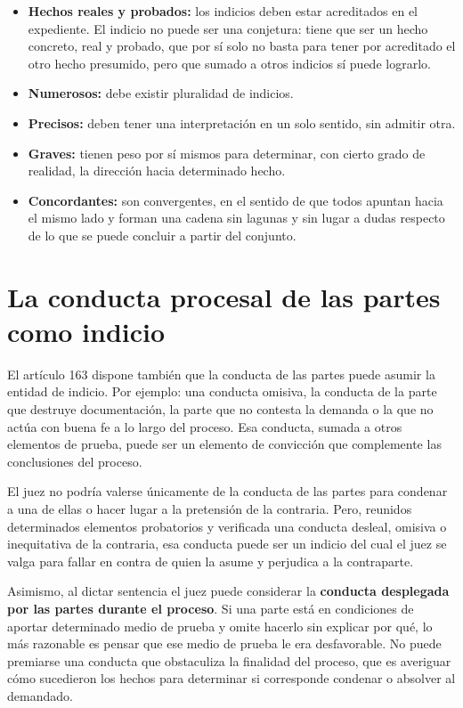 \documentclass[12pt,oneside]{book}
\begin{document}
\begin{itemize}
    \item \textbf{Hechos reales y probados:} los indicios deben estar acreditados en el expediente. El indicio no puede ser una conjetura: tiene que ser un hecho concreto, real y probado, que por sí solo no basta para tener por acreditado el otro hecho presumido, pero que sumado a otros indicios sí puede lograrlo.
    \item \textbf{Numerosos:} debe existir pluralidad de indicios.
    \item \textbf{Precisos:} deben tener una interpretación en un solo sentido, sin admitir otra.
    \item \textbf{Graves:} tienen peso por sí mismos para determinar, con cierto grado de realidad, la dirección hacia determinado hecho.
    \item \textbf{Concordantes:} son convergentes, en el sentido de que todos apuntan hacia el mismo lado y forman una cadena sin lagunas y sin lugar a dudas respecto de lo que se puede concluir a partir del conjunto.
\end{itemize}

\section{La conducta procesal de las partes como indicio}

El artículo 163 dispone también que la conducta de las partes puede asumir la entidad de indicio. Por ejemplo: una conducta omisiva, la conducta de la parte que destruye documentación, la parte que no contesta la demanda o la que no actúa con buena fe a lo largo del proceso. Esa conducta, sumada a otros elementos de prueba, puede ser un elemento de convicción que complemente las conclusiones del proceso.

\begin{important}
El juez no podría valerse únicamente de la conducta de las partes para condenar a una de ellas o hacer lugar a la pretensión de la contraria. Pero, reunidos determinados elementos probatorios y verificada una conducta desleal, omisiva o inequitativa de la contraria, esa conducta puede ser un indicio del cual el juez se valga para fallar en contra de quien la asume y perjudica a la contraparte.
\end{important}

Asimismo, al dictar sentencia el juez puede considerar la \textbf{conducta desplegada por las partes durante el proceso}. Si una parte está en condiciones de aportar determinado medio de prueba y omite hacerlo sin explicar por qué, lo más razonable es pensar que ese medio de prueba le era desfavorable. No puede premiarse una conducta que obstaculiza la finalidad del proceso, que es averiguar cómo sucedieron los hechos para determinar si corresponde condenar o absolver al demandado.
\end{document}
